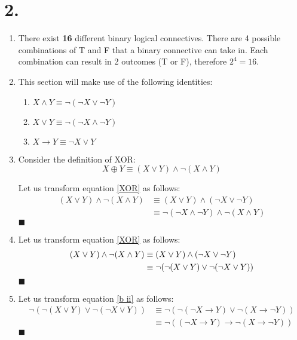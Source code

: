 \documentclass[12pt]{article}
\newcommand{\p}[1]{\item[\textnormal{(#1)}]}
\newcommand{\q}{\hfill $\blacksquare$}
\newenvironment{ps}
{\begin{enumerate}[leftmargin=0em, itemindent=1.5em]}
{\end{enumerate}}
\begin{document}
\section*{2.}
\begin{ps}

    \p{a} There exist \textbf{16} different binary logical connectives. There are
    4 possible combinations of T and F that a binary connective can take in. Each
    combination can result in 2 outcomes (T or F), therefore \(2^4 = 16\).


    \p{b} This section will make use of the following identities:

        \begin{enumerate}[label=\arabic*.]
            \item \( X \wedge Y \equiv \neg(\neg X \vee \neg Y) \)
            \item \( X \vee Y \equiv \neg(\neg X \wedge \neg Y) \)
            \item \( X \rightarrow Y \equiv \neg X \vee Y \)
        \end{enumerate}

    \p{i} Consider the definition of XOR: 
        \begin{equation}
            \label{XOR}
            X \oplus Y \equiv (X \vee Y) \wedge \neg(X \wedge Y)
        \end{equation}

        Let us transform equation \eqref{XOR} as follows:
        \begin{align*}
            (X \vee Y) \wedge \neg(X \wedge Y) &\equiv (X \vee Y) \wedge (\neg X \vee \neg Y) \\
                                               &\equiv \neg(\neg X \wedge \neg Y) \wedge \neg (X
                                               \wedge Y)
        \end{align*} \q

    \p{ii} Let us transform equation \eqref{XOR} as follows: 
        \begin{align}
            \label{b ii}
            (X \vee Y) \wedge \neg(X \wedge Y) &\equiv (X \vee Y) \wedge (\neg X \vee \neg Y) \notag \\
                                               &\equiv \neg (\neg (X \vee Y) \vee \neg (\neg X
                                               \vee Y ))
        \end{align} \q

    \p{iii} Let us transform equation \eqref{b ii} as follows: 
        \begin{align*}
            \neg (\neg (X \vee Y) \vee \neg (\neg X \vee Y )) &\equiv \neg(\neg(\neg X \rightarrow
            Y) \vee \neg(X \rightarrow \neg Y)) \\
            &\equiv \neg ((\neg X \rightarrow Y) \rightarrow \neg (X \rightarrow \neg Y))
        \end{align*} \q


\end{ps}
\end{document}
